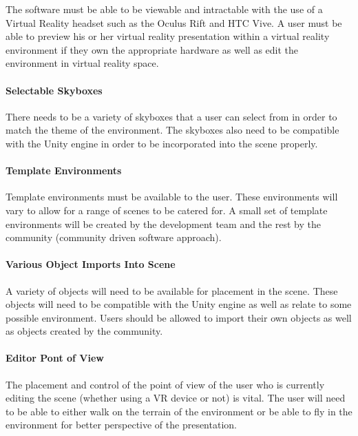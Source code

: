		The software must be able to be viewable and intractable with the use of a Virtual Reality headset such as the Oculus Rift and HTC Vive.
		A user must be able to preview his or her virtual reality presentation within a virtual reality environment if they own the appropriate hardware as well as edit the environment in virtual reality space.

		\paragraph{Selectable Skyboxes}

		There needs to be a variety of skyboxes that a user can select from in order to match the theme of the environment.
		The skyboxes also need to be compatible with the Unity engine in order to be incorporated into the scene properly.

		\paragraph{Template Environments}

		Template environments must be available to the user.
		These environments will vary to allow for a range of scenes to be catered for.
		A small set of template environments will be created by the development team and the rest by the community (community driven software approach).

		\paragraph{Various Object Imports Into Scene}

		A variety of objects will need to be available for placement in the scene.
		These objects will need to be compatible with the Unity engine as well as relate to some possible environment.
	  Users should be allowed to import their own objects as well as objects created by the community.

		\paragraph{Editor Pont of View}

		The placement and control of the point of view of the user who is currently editing the scene (whether using a VR device or not) is vital.
		The user will need to be able to either walk on the terrain of the environment or be able to fly in the environment for better perspective of the presentation.

